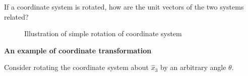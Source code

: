 If a coordinate system is rotated, how are the unit vectors of the two systems related?

\begin{figure}[h]
\begin{center}
\end{center}
\caption{Illustration of simple rotation of coordinate system}
\label{rotationofaxes}
\end{figure}



{\bf An example of coordinate transformation}

Consider rotating the coordinate system about $\hat{x}_3$ by an arbitrary angle $\theta$.

